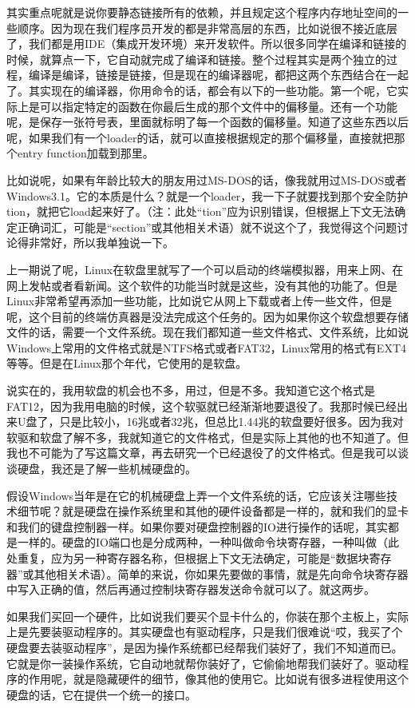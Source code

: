 \documentclass[
  letterpaper,
  DIV=11,
  numbers=noendperiod]{scrreprt}
\begin{document}
其实重点呢就是说你要静态链接所有的依赖，并且规定这个程序内存地址空间的一些顺序。因为现在我们程序员开发的都是非常高层的东西，比如说很不接近底层了，我们都是用IDE（集成开发环境）来开发软件。所以很多同学在编译和链接的时候，就算点一下，它自动就完成了编译和链接。整个过程其实是两个独立的过程，编译是编译，链接是链接，但是现在的编译器呢，都把这两个东西结合在一起了。其实现在的编译器，你用命令的话，都会有以下的一些功能。第一个呢，它实际上是可以指定特定的函数在你最后生成的那个文件中的偏移量。还有一个功能呢，是保存一张符号表，里面就标明了每一个函数的偏移量。知道了这些东西以后呢，如果我们有一个loader的话，就可以直接根据规定的那个偏移量，直接就把那个entry
function加载到那里。

比如说呢，如果有年龄比较大的朋友用过MS-DOS的话，像我就用过MS-DOS或者Windows3.1。它的本质是什么？就是一个loader，我一下子就要找到那个安全防护tion，就把它load起来好了。（注：此处``tion''应为识别错误，但根据上下文无法确定正确词汇，可能是``section''或其他相关术语）就不说这个了，我觉得这个问题讨论得非常好，所以我单独说一下。

上一期说了呢，Linux在软盘里就写了一个可以启动的终端模拟器，用来上网、在网上发帖或者看新闻。这个软件的功能当时就是这些，没有其他的功能了。但是Linux非常希望再添加一些功能，比如说它从网上下载或者上传一些文件，但是呢，这个目前的终端仿真器是没法完成这个任务的。因为如果你这个软盘想要存储文件的话，需要一个文件系统。现在我们都知道一些文件格式、文件系统，比如说Windows上常用的文件格式就是NTFS格式或者FAT32，Linux常用的格式有EXT4等等。但是在Linux那个年代，它使用的是软盘。

说实在的，我用软盘的机会也不多，用过，但是不多。我知道它这个格式是FAT12，因为我用电脑的时候，这个软驱就已经渐渐地要退役了。我那时候已经出来U盘了，只是比较小，16兆或者32兆，但总比1.44兆的软盘要好很多。因为我对软驱和软盘了解不多，我就知道它的文件格式，但是实际上其他的也不知道了。但我也不可能为了写这篇文章，再去研究一个已经退役了的文件格式。但是我可以谈谈硬盘，我还是了解一些机械硬盘的。

假设Windows当年是在它的机械硬盘上弄一个文件系统的话，它应该关注哪些技术细节呢？就是硬盘在操作系统里和其他的硬件设备都是一样的，就和我们的显卡和我们的键盘控制器一样。如果你要对硬盘控制器的IO进行操作的话呢，其实都是一样的。硬盘的IO端口也是分成两种，一种叫做命令块寄存器，一种叫做（此处重复，应为另一种寄存器名称，但根据上下文无法确定，可能是``数据块寄存器''或其他相关术语）。简单的来说，你如果先要做的事情，就是先向命令块寄存器中写入正确的值，然后再通过控制块寄存器发送命令就可以了。就这两步。

如果我们买回一个硬件，比如说我们要买个显卡什么的，你装在那个主板上，实际上是先要装驱动程序的。其实硬盘也有驱动程序，只是我们很难说``哎，我买了个硬盘要去装驱动程序''，是因为操作系统都已经帮我们装好了，我们不知道而已。它就是你一装操作系统，它自动地就帮你装好了，它偷偷地帮我们装好了。驱动程序的作用呢，就是隐藏硬件的细节，像其他的使用它。比如说有很多进程使用这个硬盘的话，它在提供一个统一的接口。
\end{document}

